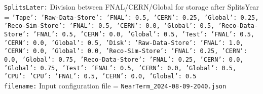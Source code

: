 {\tt SplitsLater:} Division between FNAL/CERN/Global for storage after SplitsYear = {\tt {'Tape': {'Raw-Data-Store': {'FNAL': 0.5, 'CERN': 0.25, 'Global': 0.25}, 'Reco-Sim-Store': {'FNAL': 0.5, 'CERN': 0.0, 'Global': 0.5}, 'Reco-Data-Store': {'FNAL': 0.5, 'CERN': 0.0, 'Global': 0.5}, 'Test': {'FNAL': 0.5, 'CERN': 0.0, 'Global': 0.5}}, 'Disk': {'Raw-Data-Store': {'FNAL': 1.0, 'CERN': 0.0, 'Global': 0.0}, 'Reco-Sim-Store': {'FNAL': 0.25, 'CERN': 0.0, 'Global': 0.75}, 'Reco-Data-Store': {'FNAL': 0.25, 'CERN': 0.0, 'Global': 0.75}, 'Test': {'FNAL': 0.5, 'CERN': 0.0, 'Global': 0.5}}, 'CPU': {'CPU': {'FNAL': 0.5, 'CERN': 0.0, 'Global': 0.5}}}} \\
{\tt filename:} Input configuration file = {\tt NearTerm\_2024-08-09-2040.json} \\
